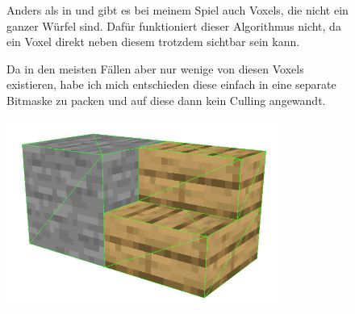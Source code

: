 \begin{figure}[ht]
	\begin{minipage}[c]{0.63\textwidth}
Anders als in \cite{yt_bin_greedy_mesher} und
\cite{gh_bin_greedy_mesher} gibt es bei meinem
Spiel auch Voxels, die nicht ein ganzer Würfel
sind. Dafür funktioniert dieser Algorithmus nicht,
da ein Voxel direkt neben diesem trotzdem sichtbar
sein kann.

Da in den meisten Fällen aber nur wenige von diesen
 Voxels existieren, habe ich mich
entschieden diese einfach in eine separate Bitmaske
zu packen und auf diese dann kein Culling angewandt.
	\end{minipage}
	\begin{minipage}[c]{0.35\textwidth}
		\begin{center}
\includegraphics[width=0.8\textwidth]{../assets/culling/stair_next_to_stone.png}
		\end{center}
	\end{minipage}\hfill
\end{figure}
